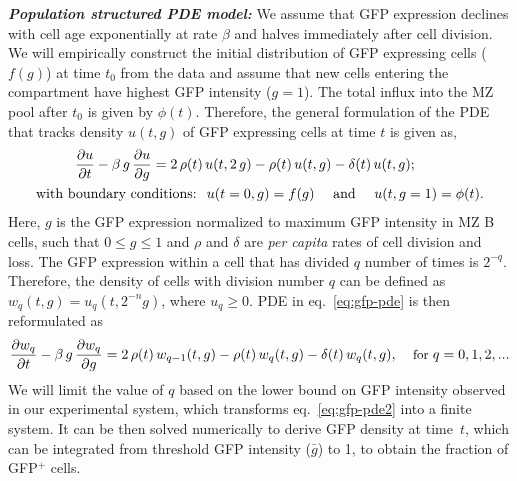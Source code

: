 \documentclass[11pt]{article}
\begin{document}
\textbf{\textit{Population structured PDE model:}}
We assume that GFP expression declines with cell age exponentially at rate $\beta$ and halves immediately after cell division.
We will empirically construct the initial distribution of GFP expressing cells ($f(g)$) at time $t_{0}$ from the data and
assume that new cells entering the compartment have highest GFP intensity ($g=1$).
The total influx into the MZ pool after $t_0$ is given by $\phi(t)$.
Therefore, the general formulation of the PDE that tracks density $u(t, g)$  of GFP expressing cells at time $t$ is given as,
\begin{equation}
\begin{aligned}
\small
\frac{\partial u}{\partial t}  - \beta \,g \, \frac{\partial u}{\partial g} = 2\,  \rho(t) & \, u(t, 2\,g) - \rho(t) \, u(t, g) - \delta(t)  \, u(t, g); 
\\
\text{with boundary conditions: }& \;  u(t=0, g) = f(g) \quad \text{ and } \quad u(t, g=1) = \phi(t).
\label{eq:gfp-pde}
\end{aligned}
\end{equation}
Here, $g$ is the GFP expression normalized to maximum GFP intensity in MZ B cells, such that $0 \le g \le 1$ and $\rho$ and $\delta$ are \textit{per capita} rates of cell division and loss.
The GFP expression within a cell that has divided $q$ number of times is $2^{-q}$. 
Therefore, the density of cells with division number $q$ can be defined as $w_{q}(t, g) = u_{q}(t, 2^{-n} g)$, where $u_{q} \ge 0$. %
PDE in eq.~\ref{eq:gfp-pde} is then reformulated as
\begin{equation} 
\small
\frac{\partial w_{q}}{\partial t}  - \beta \,g \, \frac{\partial w_{q}}{\partial g} = 2\, \rho(t)  \, w_{q-1}(t, g) - \rho(t) \, w_{q}(t, g)  - \delta(t)  \, w_{q}(t, g), \quad \, \text{for } q = 0, 1, 2, ...
\label{eq:gfp-pde2}
\end{equation}
We will limit the value of $q$ based on the lower bound on GFP intensity observed in our experimental system, which transforms {eq.~\ref{eq:gfp-pde2}} into a finite system.
It can be then solved numerically to derive GFP density at time~$t$, which can be integrated from threshold GFP intensity ($\bar{g}$) to 1, to obtain the fraction of GFP$^{+}$ cells. 
\end{document}
